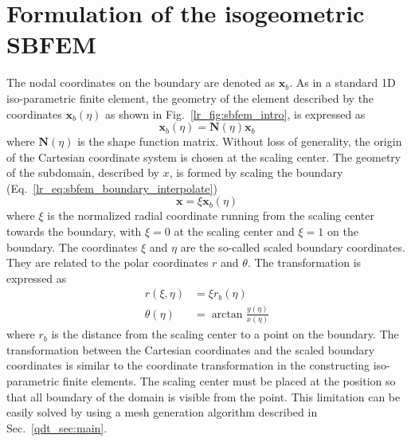 \section{Formulation of the isogeometric SBFEM}
\label{iso_section:formulation}
The nodal coordinates on the boundary are denoted as $\mathbf{x}_b$. As in a standard 1D iso-parametric finite element, the geometry of the element described by the coordinates $\mathbf{x}_b(\eta)$ as shown in Fig.~\ref{lr_fig:sbfem_intro}, is expressed as
\begin{equation}
    \mathbf{x}_b(\eta) = \mathbf{N}(\eta) \mathbf{x}_b
    \label{lr_eq:sbfem_boundary_interpolate}
\end{equation}
%
where $\mathbf{N}(\eta)$ is the shape function matrix.
Without loss of generality, the origin of the Cartesian coordinate system is chosen at the scaling center.
The geometry of the subdomain, described by $x$, is formed by scaling the boundary (Eq.~\ref{lr_eq:sbfem_boundary_interpolate})
\begin{equation}
    \mathbf{x} = \xi \mathbf{x}_b (\eta)
    \label{lr_eq:sbfem_scaling}
\end{equation}
%
where $\xi$ is the normalized radial coordinate running from the scaling center towards the boundary, with $\xi=0$ at the scaling center and $\xi=1$ on the boundary.
The coordinates $\xi$ and $\eta$ are the so-called scaled boundary coordinates.
They are related to the polar coordinates $r$ and $\theta$.
The transformation is expressed as
\begin{equation}
\begin{aligned}
    r(\xi,\eta) &= \xi r_b(\eta)     \\
    \theta(\eta) &= \arctan \frac{y(\eta)}{x(\eta)}
    \label{lr_eq:sbfem_transform}
\end{aligned}
\end{equation}
%
where $r_b$ is the distance from the scaling center to a point on the boundary.
The transformation between the Cartesian coordinates and the scaled boundary coordinates is similar to the coordinate transformation in the constructing iso-parametric finite elements.
The scaling center must be placed at the position so that all boundary of the domain is visible from the point.
This limitation can be easily solved by using a mesh generation algorithm described in Sec.~\ref{qdt_sec:main}.

